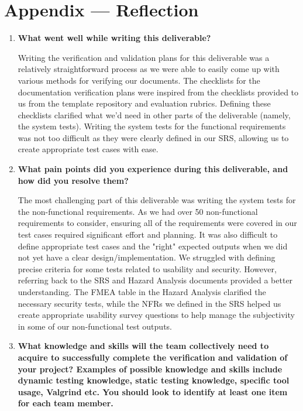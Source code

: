 \documentclass[12pt, titlepage]{article}
\begin{document}
\newpage{}
\section*{Appendix --- Reflection}

% 

\begin{enumerate}
  \item \textbf{What went well while writing this deliverable?}
  
    Writing the verification and validation plans for this deliverable was a
    relatively straightforward process as we were able to easily come up with
    various methods for verifying our documents. The checklists for the
    documentation verification plans were inspired from the checklists provided
    to us from the template repository and evaluation rubrics. Defining these
    checklists clarified what we'd need in other parts of the deliverable
    (namely, the system tests). Writing the system tests for the functional
    requirements was not too difficult as they were clearly defined in our SRS,
    allowing us to create appropriate test cases with ease. 
  
  \smallskip
  \item \textbf{What pain points did you experience during this deliverable, and
  how did you resolve them?}

  The most challenging part of this deliverable was writing the system tests for
  the non-functional requirements. As we had over 50 non-functional requirements
  to consider, ensuring all of the requirements were covered in our test cases
  required significant effort and planning. It was also difficult to define
  appropriate test cases and the "right" expected outputs when we did not yet
  have a clear design/implementation. We struggled with defining precise
  criteria for some tests related to usability and security. However, referring
  back to the SRS and Hazard Analysis documents provided a better understanding.
  The FMEA table in the Hazard Analysis clarified the necessary security tests,
  while the NFRs we defined in the SRS helped us create appropriate usability
  survey questions to help manage the subjectivity in some of our non-functional
  test outputs.
    
  \smallskip
  \item \textbf{What knowledge and skills will the team collectively need to
  acquire to successfully complete the verification and validation of your
  project? Examples of possible knowledge and skills include dynamic testing
  knowledge, static testing knowledge, specific tool usage, Valgrind etc.  You
  should look to identify at least one item for each team member.}
  

\end{enumerate}
\end{document}
